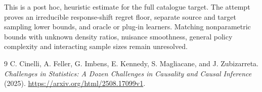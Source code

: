 \documentclass[11pt]{article}
\theoremstyle{remark}
\begin{document}
This is a post hoc, heuristic estimate for the full catalogue target.
The attempt proves an irreducible response-shift regret floor, separate source and target sampling lower bounds, and oracle or plug-in learners. Matching nonparametric bounds with unknown density ratios, nuisance smoothness, general policy complexity and interacting sample sizes remain unresolved.

\begin{thebibliography}{9}
 C. Cinelli, A. Feller, G. Imbens, E. Kennedy, S. Magliacane, and J. Zubizarreta. \emph{Challenges in Statistics: A Dozen Challenges in Causality and Causal Inference} (2025). \url{https://arxiv.org/html/2508.17099v1}.
\end{thebibliography}
\end{document}
